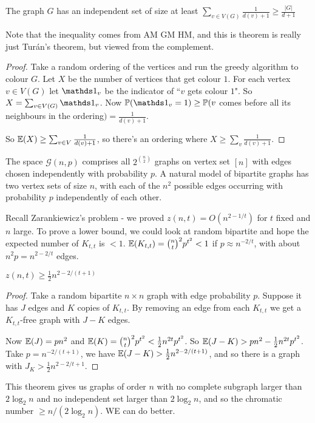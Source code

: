 \documentclass[10pt,a4paper]{article}
\begin{document}
\begin{theorem}
The graph $G$ has an independent set of size at least $\sum_{v \in V(G)} \frac{1}{d(v)+1}\geq \frac{|G|}{d+1}$
\end{theorem}
Note that the inequality comes from AM \leq GM \leq HM, and this is theorem is really just Tur\'an's theorem, but viewed from the complement.
\begin{proof}
Take a random ordering of the vertices and run the greedy algorithm to colour $G$. Let $X$ be the number of vertices that get colour $1$. For each vertex $v \in V(G)$ let $\one_v$ be the indicator of ``$v$ gets colour $1$". So $X = \sum_{v \in V(G)} \one_v$. Now $\P(\one_v = 1) \geq \P(v $ comes before all its neighbours in the ordering$) = \frac{1}{d(v)+1}$.

So $\mathbb{E}(X) \geq \sum_{v \in V} \frac{1}{d(v)+1}$, so there's an ordering where $X \geq \sum_{v} \frac{1}{d(v)+1}$. 
\end{proof}
The space $\mathcal{G}(n,p)$ comprises all $2^{\binom{n}{2}}$ graphs on vertex set $[n]$ with edges chosen independently with probability $p$. A natural model of bipartite graphs has two vertex sets of size $n$, with each of the $n^2$ possible edges occurring with probability $p$ independently of each other.

Recall Zarankiewicz's problem - we proved $z(n,t) = O(n^{2-1/t})$ for $t$ fixed and $n$ large. To prove a lower bound, we could look at random bipartite and hope the expected number of $K_{t,t}$ is $<1$. $\mathbb{E}(K_{t,t}) = \binom{n}{t}^2 p^{t^2} < 1$ if $p \approx n^{-2/t}$, with about $n^2 p = n^{2-2/t}$ edges.

\begin{theorem}
$z(n,t) \geq \frac{1}{2}n^{2-2/(t+1)}$
\end{theorem}
\begin{proof}
Take a random bipartite $n \times n$ graph with edge probability $p$. Suppose it has $J$ edges and $K$ copies of $K_{t,t}$. By removing an edge from each $K_{t,t}$ we get a $K_{t,t}$-free graph with $J-K$ edges.

Now $\mathbb{E}(J) = pn^2$ and $\mathbb{E}(K) = \binom{n}{t}^2 p^{t^2} < \frac{1}{2}n^{2t}p^{t^2}$. So $\mathbb{E}(J-K) > pn^2 - \frac{1}{2}n^{2t}p^{t^2}$. Take $p = n^{-2/(t+1)}$, we have $\mathbb{E}(J-K) > \frac{1}{2}n^{2-2/(t+1)}$, and so there is a graph with $J_K > \frac{1}{2}n^{2-2/t+1}$.
\end{proof}
This theorem gives us graphs of order $n$ with no complete subgraph larger than $2 \log_2 n$ and no independent set larger than $2 \log_2 n$, and so the chromatic number $\geq n/(2\log_2 n)$. WE can do better.
\end{document}
